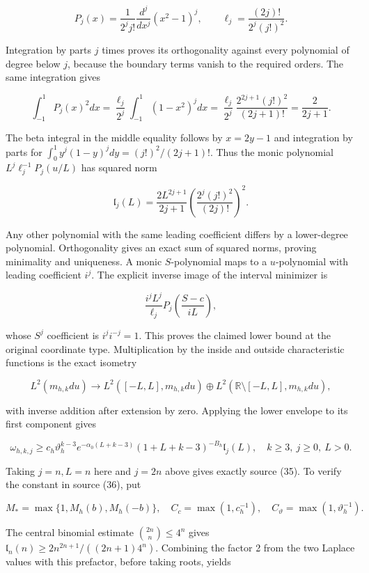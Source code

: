 \[
P_j(x)=\frac1{2^jj!}\frac{d^j}{dx^j}(x^2-1)^j,
\qquad \ell_j=\frac{(2j)!}{2^j(j!)^2}.
\]

Integration by parts \(j\) times proves its orthogonality against every polynomial of degree below \(j\), because the boundary terms vanish to the required orders. The same integration gives

\[
\int_{-1}^1P_j(x)^2dx
=\frac{\ell_j}{2^j}\int_{-1}^1(1-x^2)^jdx
=\frac{\ell_j}{2^j}\frac{2^{2j+1}(j!)^2}{(2j+1)!}
=\frac2{2j+1}.
\]

The beta integral in the middle equality follows by \(x=2y-1\) and integration by parts for \(\int_0^1y^j(1-y)^jdy=(j!)^2/(2j+1)!\). Thus the monic polynomial \(L^j\ell_j^{-1}P_j(u/L)\) has squared norm

\[
\mathfrak l_j(L)=\frac{2L^{2j+1}}{2j+1}
\left(\frac{2^j(j!)^2}{(2j)!}\right)^2.
\]

Any other polynomial with the same leading coefficient differs by a lower-degree polynomial. Orthogonality gives an exact sum of squared norms, proving minimality and uniqueness. A monic \(S\)-polynomial maps to a \(u\)-polynomial with leading coefficient \(i^j\). The explicit inverse image of the interval minimizer is

\[
\frac{i^jL^j}{\ell_j}P_j\left(\frac{S-c}{iL}\right),
\]

whose \(S^j\) coefficient is \(i^j i^{-j}=1\). This proves the claimed lower bound at the original coordinate type. Multiplication by the inside and outside characteristic functions is the exact isometry

\[
L^2(m_{h,k}du)\longrightarrow
L^2([-L,L],m_{h,k}du)\oplus L^2(\mathbb R\setminus[-L,L],m_{h,k}du),
\]

with inverse addition after extension by zero. Applying the lower envelope to its first component gives

\[
\omega_{h,k,j}\ge c_h\vartheta_h^{k-3}
e^{-\alpha_0(L+k-3)}(1+L+k-3)^{-B_h}\mathfrak l_j(L),
\quad k\ge3,\ j\ge0,\ L>0.
\]

Taking \(j=n,L=n\) here and \(j=2n\) above gives exactly source (35). To verify the constant in source (36), put

\[
M_* =\max\{1,M_h(b),M_h(-b)\},\quad
C_c=\max(1,c_h^{-1}),\quad C_\vartheta=\max(1,\vartheta_h^{-1}).
\]

The central binomial estimate \(\binom{2n}{n}\le4^n\) gives \(\mathfrak l_n(n)\ge2n^{2n+1}/((2n+1)4^n)\). Combining the factor 2 from the two Laplace values with this prefactor, before taking roots, yields

